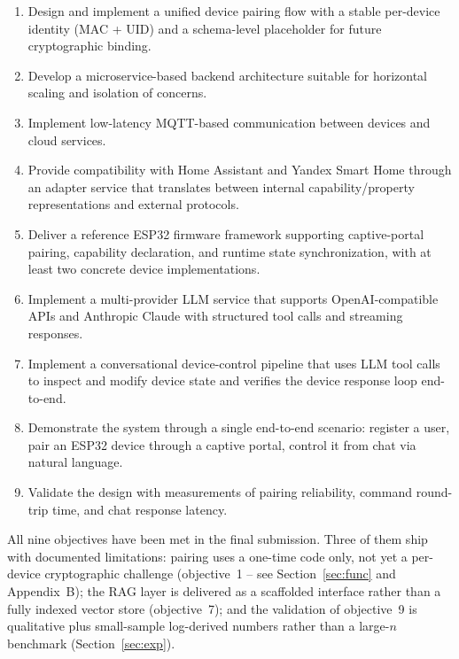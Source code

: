 \documentclass[a4paper,12pt]{article}
\begin{document}
\begin{enumerate}
  \item Design and implement a unified device pairing flow with a stable per-device identity (MAC + UID) and a schema-level placeholder for future cryptographic binding.
  \item Develop a microservice-based backend architecture suitable for horizontal scaling and isolation of concerns.
  \item Implement low-latency MQTT-based communication between devices and cloud services.
  \item Provide compatibility with Home Assistant and Yandex Smart Home through an adapter service that translates between internal capability/property representations and external protocols.
  \item Deliver a reference ESP32 firmware framework supporting captive-portal pairing, capability declaration, and runtime state synchronization, with at least two concrete device implementations.
  \item Implement a multi-provider LLM service that supports OpenAI-compatible APIs and Anthropic Claude with structured tool calls and streaming responses.
  \item Implement a conversational device-control pipeline that uses LLM tool calls to inspect and modify device state and verifies the device response loop end-to-end.
  \item Demonstrate the system through a single end-to-end scenario: register a user, pair an ESP32 device through a captive portal, control it from chat via natural language.
  \item Validate the design with measurements of pairing reliability, command round-trip time, and chat response latency.
\end{enumerate}

All nine objectives have been met in the final submission. Three of them ship with documented limitations: pairing uses a one-time code only, not yet a per-device cryptographic challenge (objective~1 -- see Section~\ref{sec:func} and Appendix~B); the RAG layer is delivered as a scaffolded interface rather than a fully indexed vector store (objective~7); and the validation of objective~9 is qualitative plus small-sample log-derived numbers rather than a large-$n$ benchmark (Section~\ref{sec:exp}).

\newpage

\end{document}
